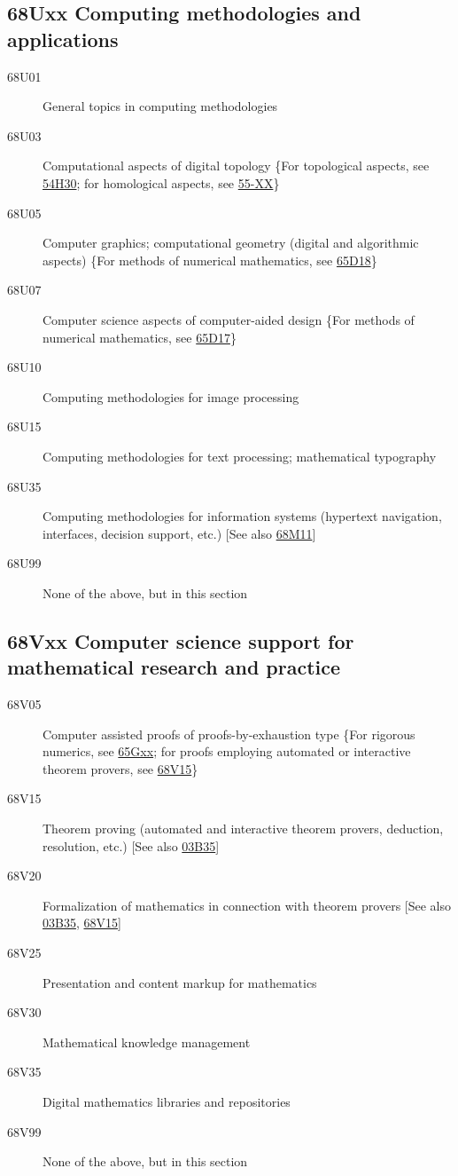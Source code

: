 \documentclass[letterpaper]{article}
\begin{document}
\subsection*{68Uxx  Computing methodologies and applications }\label{68Uxx}
\begin{description}
\item [68U01]\label{68U01} General topics in computing methodologies
\item [68U03]\label{68U03} Computational aspects of digital topology \{For topological aspects, see \hyperref[54H30]{54H30}; for homological aspects, see \hyperref[55-XX]{55-XX}\}
\item [68U05]\label{68U05} Computer graphics; computational geometry (digital and algorithmic aspects) \{For methods of numerical mathematics, see \hyperref[65D18]{65D18}\}
\item [68U07]\label{68U07} Computer science aspects of computer-aided design \{For methods of numerical mathematics, see \hyperref[65D17]{65D17}\}
\item [68U10]\label{68U10} Computing methodologies for image processing
\item [68U15]\label{68U15} Computing methodologies for text processing; mathematical typography
\item [68U35]\label{68U35} Computing methodologies for information systems (hypertext navigation, interfaces, decision support, etc.) [See also \hyperref[68M11]{68M11}]
\item [68U99]\label{68U99} None of the above, but in this section
\end{description}
\subsection*{68Vxx  Computer science support for mathematical research and practice }\label{68Vxx}
\begin{description}
\item [68V05]\label{68V05} Computer assisted proofs of proofs-by-exhaustion type \{For rigorous numerics, see \hyperref[65Gxx]{65Gxx}; for proofs employing automated or interactive theorem provers, see \hyperref[68V15]{68V15}\}
\item [68V15]\label{68V15} Theorem proving (automated and interactive theorem provers, deduction, resolution, etc.) [See also \hyperref[03B35]{03B35}]
\item [68V20]\label{68V20} Formalization of mathematics in connection with theorem provers [See also \hyperref[03B35]{03B35}, \hyperref[68V15]{68V15}]
\item [68V25]\label{68V25} Presentation and content markup for mathematics
\item [68V30]\label{68V30} Mathematical knowledge management
\item [68V35]\label{68V35} Digital mathematics libraries and repositories
\item [68V99]\label{68V99} None of the above, but in this section
\end{description}
\end{document}
